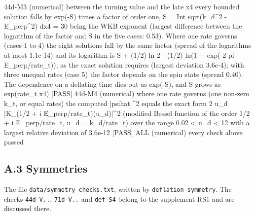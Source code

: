 \documentclass[
  10pt,
]{article}
\newenvironment{Shaded}{}{}
\newcommand{\NormalTok}[1]{#1}
\begin{document}
\begin{Shaded}
\begin{Highlighting}[]
\NormalTok{[PASS] 44d{-}M3  (numerical) between the turning value and the late x4 every bounded solution falls by exp({-}S) times a factor of order one, S = Int sqrt(k\_d\^{}2 {-} E\_perp\^{}2) dx4 = 30 being the WKB exponent (largest difference between the logarithm of the factor and S in the five cases: 0.53). Where one rate governs (cases 1 to 4) the eight solutions fall by the same factor (spread of the logarithms at most 1.1e{-}14) and its logarithm is S + (1/2) ln 2 {-} (1/2) ln(1 + exp({-}2 pi E\_perp/rate\_t)), as the exact solution requires (largest deviation 3.6e{-}4); with three unequal rates (case 5) the factor depends on the spin state (spread 0.40). The dependence on a deflating time dies out as exp({-}S), and S grows as exp(rate\_t x4)}
\NormalTok{[PASS] 44d{-}M4  (numerical) where one rate governs (one non{-}zero k\_t, or equal rates) the computed |psihat|\^{}2 equals the exact form 2 u\_d |K\_(1/2 + i E\_perp/rate\_t)(u\_d)|\^{}2 (modified Bessel function of the order 1/2 + i E\_perp/rate\_t, u\_d = k\_d/rate\_t) over the range 0.02 \textless{} u\_d \textless{} 12 with a largest relative deviation of 3.6e{-}12}
\NormalTok{[PASS] ALL  (numerical) every check above passed}
\end{Highlighting}
\end{Shaded}

\hypertarget{a.3-symmetries}{%
\subsection{A.3 Symmetries}\label{a.3-symmetries}}

The file \texttt{data/symmetry\_checks.txt}, written by
\texttt{deflation\ symmetry}. The checks \texttt{44d-V..},
\texttt{71d-V..} and \texttt{def-S4} belong to the supplement RS1 and
are discussed there.
\end{document}
